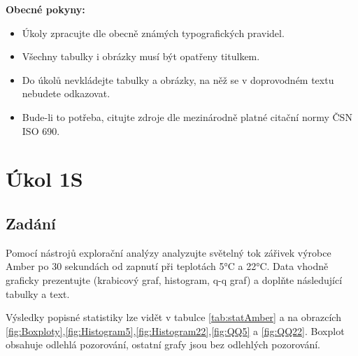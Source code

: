 \documentclass[czech]{article}%
\begin{document}
\noindent
\textbf{Obecné pokyny:}
\begin{itemize}
    \item Úkoly zpracujte dle obecně známých typografických pravidel.
    \item Všechny tabulky i obrázky musí být opatřeny titulkem.
    \item Do úkolů nevkládejte tabulky a obrázky, na něž se v doprovodném textu nebudete odkazovat.
    \item Bude-li to potřeba, citujte zdroje dle mezinárodně platné citační normy ČSN ISO 690.
\end{itemize}


\newpage
\section{Úkol 1S}
\subsection{Zadání}
Pomocí nástrojů explorační analýzy analyzujte světelný tok zářivek výrobce Amber po 30 sekundách od zapnutí při teplotách 5°C a 22°C. Data vhodně graficky prezentujte (krabicový graf, histogram, q-q graf) a doplňte následující tabulky a text.

Výsledky popisné statistiky lze vidět v tabulce \ref{tab:statAmber} a na obrazcích \ref{fig:Boxploty},\ref{fig:Histogram5},\ref{fig:Histogram22},\ref{fig:QQ5} a \ref{fig:QQ22}.
Boxplot obsahuje odlehlá pozorování, ostatní grafy jsou bez odlehlých pozorování.
\end{document}
